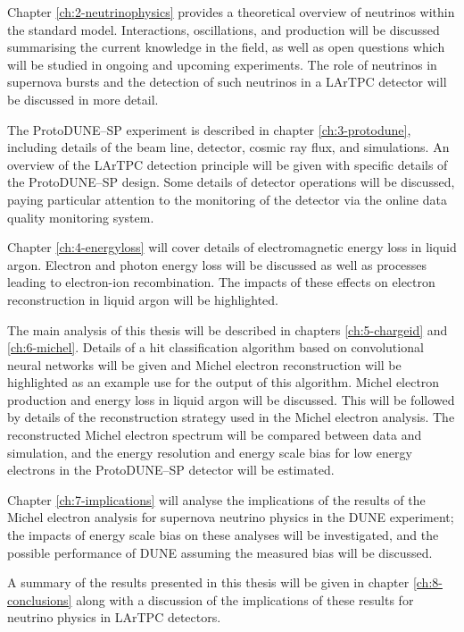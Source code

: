 Chapter \ref{ch:2-neutrinophysics} provides a theoretical overview of neutrinos
within the standard model. Interactions, oscillations, and production will be
discussed summarising the current knowledge in the field, as well as open
questions which will be studied in ongoing and upcoming experiments. The role of
neutrinos in supernova bursts and the detection of such neutrinos in a LArTPC
detector will be discussed in more detail.

The ProtoDUNE--SP experiment is described in chapter \ref{ch:3-protodune},
including details of the beam line, detector, cosmic ray flux, and simulations.
An overview of the LArTPC detection principle will be given with specific
details of the ProtoDUNE--SP design. Some details of detector operations will be
discussed, paying particular attention to the monitoring of the detector via the
online data quality monitoring system.

Chapter \ref{ch:4-energyloss} will cover details of electromagnetic energy loss
in liquid argon. Electron and photon energy loss will be discussed as well as
processes leading to electron-ion recombination. The impacts of these effects on
electron reconstruction in liquid argon will be highlighted.

The main analysis of this thesis will be described in chapters
\ref{ch:5-chargeid} and \ref{ch:6-michel}. Details of a hit classification
algorithm based on convolutional neural networks will be given and Michel
electron reconstruction will be highlighted as an example use for the output of
this algorithm. Michel electron production and energy loss in liquid argon will
be discussed. This will be followed by details of the reconstruction strategy
used in the Michel electron analysis. The reconstructed Michel electron spectrum
will be compared between data and simulation, and the energy resolution and
energy scale bias for low energy electrons in the ProtoDUNE--SP detector will be
estimated. 

Chapter \ref{ch:7-implications} will analyse the implications of the results of
the Michel electron analysis for supernova neutrino physics in the DUNE
experiment; the impacts of energy scale bias on these analyses will be
investigated, and the possible performance of DUNE assuming the measured bias
will be discussed.

A summary of the results presented in this thesis will be given in chapter
\ref{ch:8-conclusions} along with a discussion of the implications of these
results for neutrino physics in LArTPC detectors.
